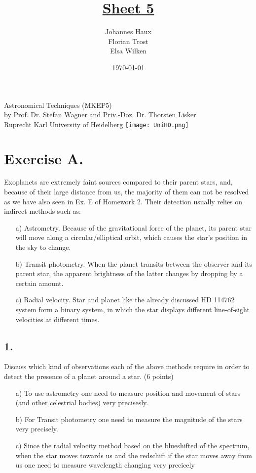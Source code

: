 \documentclass[11pt,a4paper,twoside]{article}
\title{\LARGE \underline {Sheet 5}}
\author{Johannes Haux \\ Florian Trost \\ Elsa Wilken}
\date{\today}
\begin{document}
\maketitle
\thispagestyle{empty}

\begin{center}
  Astronomical Techniques (MKEP5) \\
  \baselineskip35pt
  by Prof. Dr. Stefan Wagner and Priv.-Doz. Dr. Thorsten Lisker \\
  \baselineskip60pt
  Ruprecht Karl University of Heidelberg
\vskip 40pt
\texttt{[image: UniHD.png]}

\end{center}

\newpage
\setcounter{page}{1}		%

\section*{Exercise A.}
Exoplanets are extremely faint sources compared to their parent stars, and,
because of their large distance from us, the majority of them can not be resolved as we have also seen in Ex. E of Homework 2. Their detection usually relies on indirect methods
such as:\\
\begin{itemize}
	\item[a)]  Astrometry. Because of the gravitational force of the planet, its parent star will move along a circular/elliptical orbit, which causes the star's position in the sky to change.\\
	\item[b)] Transit photometry. When the planet transits between the observer and its parent star, the apparent brightness of the latter changes by dropping by a certain amount.\\
	\item[c)] Radial velocity. Star and planet like the already discussed HD 114762 system form a binary system, in which the star displays different line-of-sight velocities at different times.
\end{itemize}
\subsection*{1.}
Discuss which kind of observations each of the above methods require in order to detect
the presence of a planet around a star. (6 points)\\
\begin{itemize}
	\item [a)] To use astrometry one need to measure position and movement of stars (and other celestrial bodies) very precisesly.  
	\item [b)] For Transit photometry one need to measure the magnitude of the stars very precisely.
	\item [c)] Since the radial velocity method based on the blueshifted of the spectrum, when the star moves towards us and the redschift if the star moves away from us one need to measure wavelength changing very precicely
\end{itemize}
\end{document}
